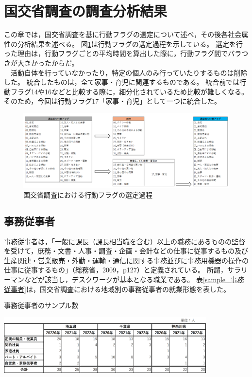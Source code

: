 \documentclass[paper={210mm,297mm},line_length=35zw,number_of_lines=31,head_space=30mm,gutter=40mm,baselineskip=2.0zw,headfoot_verticalposition=1.5zw]{jlreq}
\begin{document}
\section{国交省調査の調査分析結果}

この章では，国交省調査を基に行動フラグの選定について述べ，その後各社会属性の分析結果を述べる。
図\ref{行動フラグの選定}は行動フラグの選定過程を示している。
選定を行った理由は，行動フラグごとの平均時間を算出した際に，行動フラグ間でバラつきが大きかったからだ。\\
　活動自体を行っていなかったり，特定の個人のみ行っていたりするものは削除した。
統合したものは，全て家事・育児に関連するものである。
統合前では行動フラグ14や16などと比較する際に，細分化されているため比較が難しくなる。
そのため，今回は行動フラグ17「家事・育児」として一つに統合した。\\

\begin{figure}[H]
  \centering
  \includegraphics[width=120mm]{../Figure/c04_fig_行動フラグの選定過程.png}
  \caption{国交省調査における行動フラグの選定過程}
  \label{行動フラグの選定}
\end{figure}

\subsection{事務従事者}

事務従事者は，「一般に課長（課長相当職を含む）以上の職務にあるものの監督を受けて，庶務・文書・人事・調査・企画・会計などの仕事に従事するもの及び生産関連・営業販売・外勤・運輸・通信に関する事務並びに事務用機器の操作の仕事に従事するもの」（総務省，2009，p127）と定義されている。
所謂，サラリーマンなどが該当し，デスクワークが基本となる職業である。
表\ref{sample_事務従事者}は，国交省調査における地域別の事務従事者の就業形態を表した。\\

\begin{table}[H]
  \centering
  \caption{事務従事者のサンプル数}
  \includegraphics[width=110mm]{../Figure/c04s01_table_事務従事者_サンプル数.png}
  \label{sample_事務従事者}
\end{table}
\end{document}
